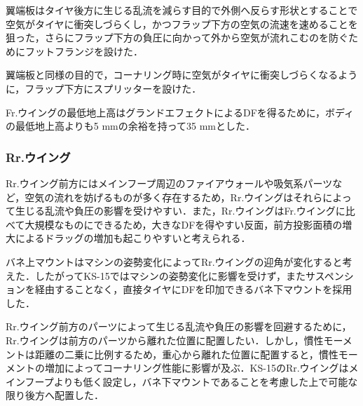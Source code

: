 翼端板はタイヤ後方に生じる乱流を減らす目的で外側へ反らす形状とすることで空気がタイヤに衝突しづらくし，かつフラップ下方の空気の流速を速めることを狙った，さらにフラップ下方の負圧に向かって外から空気が流れこむのを防ぐためにフットフランジを設けた．

翼端板と同様の目的で，コーナリング時に空気がタイヤに衝突しづらくなるように，フラップ下方にスプリッターを設けた．




Fr.ウイングの最低地上高はグランドエフェクトによるDFを得るために，ボディの最低地上高よりも5 mmの余裕を持って35 mmとした．

\subsubsection{Rr.ウイング}
Rr.ウイング前方にはメインフープ周辺のファイアウォールや吸気系パーツなど，空気の流れを妨げるものが多く存在するため，Rr.ウイングはそれらによって生じる乱流や負圧の影響を受けやすい．また，Rr.ウイングはFr.ウイングに比べて大規模なものにできるため，大きなDFを得やすい反面，前方投影面積の増大によるドラッグの増加も起こりやすいと考えられる．

バネ上マウントはマシンの姿勢変化によってRr.ウイングの迎角が変化すると考えた．したがってKS-15ではマシンの姿勢変化に影響を受けず，またサスペンションを経由することなく，直接タイヤにDFを印加できるバネ下マウントを採用した．

Rr.ウイング前方のパーツによって生じる乱流や負圧の影響を回避するために，Rr.ウイングは前方のパーツから離れた位置に配置したい．しかし，慣性モーメントは距離の二乗に比例するため，重心から離れた位置に配置すると，慣性モーメントの増加によってコーナリング性能に影響が及ぶ．KS-15のRr.ウイングはメインフープよりも低く設定し，バネ下マウントであることを考慮した上で可能な限り後方へ配置した．

